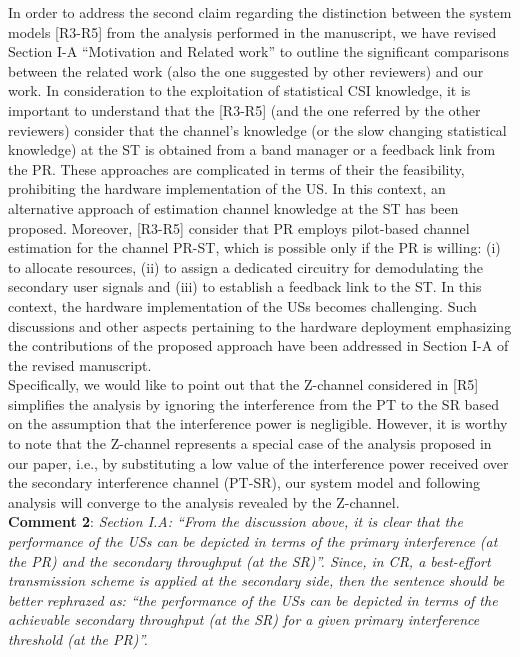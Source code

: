 \documentclass[12pt,a4wide,peerreview]{IEEEtran}
\newcommand{\tc}[1]{#1}
\begin{document}
In order to address the second claim regarding the distinction between the system models [R3-R5] from the analysis performed in the manuscript, we have revised Section I-A ``Motivation and Related work'' to outline the significant comparisons between the related work (also the one suggested by other reviewers) and our work. In consideration to the exploitation of statistical CSI knowledge, it is important to understand that the [R3-R5] (and the one referred by the other reviewers) consider that the channel's knowledge (or the slow changing statistical knowledge) at the ST is obtained from a band manager or a feedback link from the PR. These approaches are complicated in terms of their the feasibility, prohibiting the hardware implementation of the US. In this context, an alternative approach of estimation channel knowledge at the ST has been proposed. Moreover, [R3-R5] consider that PR employs pilot-based channel estimation for the channel PR-ST, which is possible only if the PR is willing: (i) to allocate resources, (ii) to assign a dedicated circuitry for demodulating the secondary user signals and (iii) to establish a feedback link to the ST. In this context, the hardware implementation of the USs becomes challenging. Such discussions and other aspects pertaining to the hardware deployment emphasizing the contributions of the proposed approach have been addressed in Section I-A of the revised manuscript. \\ 
Specifically, we would like to point out that the Z-channel considered in [R5] simplifies the analysis by ignoring the interference from the PT to the SR based on the assumption that the interference power is negligible. However, it is worthy to note that the Z-channel represents a special case of the analysis proposed in our paper, i.e., by substituting a low value of the interference power received over the secondary interference channel (PT-SR), our system model and following analysis will converge to the analysis revealed by the Z-channel. 
\\
\textbf{\tc{Comment 2}}: 
\textit{
Section I.A: ``From the discussion above, it is clear that the performance of the USs can be depicted in terms of the primary interference (at the PR) and the secondary throughput (at the SR)''. Since, in CR, a best-effort transmission scheme is applied at the secondary side, then the sentence should be better rephrazed as: ``the performance of the USs can be depicted in terms of the achievable secondary throughput (at the SR) for a given primary interference threshold (at the PR)''.
}
\end{document}
